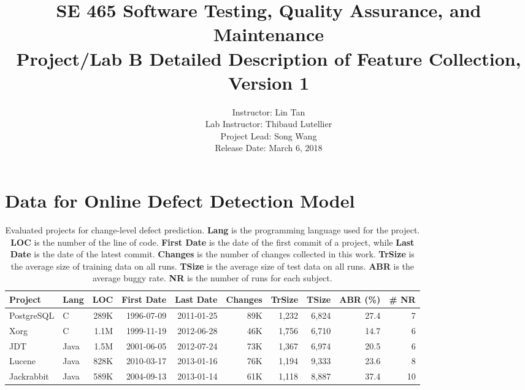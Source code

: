 \documentclass[10pt]{article}
\newcommand{\postgresqlloc}{289K}
\newcommand{\postgresqlfirstdate}{1996-07-09}
\newcommand{\postgresqllastdate}{2011-01-25}
\newcommand{\postgresqlchanges}{89K}
\newcommand{\postgresqlexpbr}{27.4}
\newcommand{\postgresqlTrain}{1,232}
\newcommand{\postgresqlTest}{6,824}
\newcommand{\xorgloc}{1.1M}
\newcommand{\xorgfirstdate}{1999-11-19}
\newcommand{\xorglastdate}{2012-06-28}
\newcommand{\xorgchanges}{46K}
\newcommand{\xorgexpbr}{14.7}
\newcommand{\xorgTrain}{1,756}
\newcommand{\xorgTest}{6,710}
\newcommand{\eclipseloc}{1.5M}
\newcommand{\eclipsefirstdate}{2001-06-05}
\newcommand{\eclipselastdate}{2012-07-24}
\newcommand{\eclipsechanges}{73K}
\newcommand{\eclipseexpbr}{20.5}
\newcommand{\eclipseTrain}{1,367}
\newcommand{\eclipseTest}{6,974}
\newcommand{\luceneloc}{828K}
\newcommand{\lucenefirstdate}{2010-03-17}
\newcommand{\lucenelastdate}{2013-01-16}
\newcommand{\lucenechanges}{76K}
\newcommand{\luceneexpbr}{23.6}
\newcommand{\luceneTrain}{1,194}
\newcommand{\luceneTest}{9,333}
\newcommand{\jackrabbitloc}{589K}
\newcommand{\jackrabbitfirstdate}{2004-09-13}
\newcommand{\jackrabbitlastdate}{2013-01-14}
\newcommand{\jackrabbitchanges}{61K}
\newcommand{\jackrabbitexpbr}{37.4}
\newcommand{\jackrabbitTrain}{1,118}
\newcommand{\jackrabbitTest}{8,887}
\begin{document}
\title{
SE 465 Software Testing, Quality Assurance, and Maintenance\\
Project/Lab B Detailed Description of Feature Collection, Version 1}
\author{Instructor: Lin Tan \\
Lab Instructor: Thibaud Lutellier \\
Project Lead: Song Wang\\
Release Date:  March 6, 2018 \\ 
}
\renewcommand{\today}{}
\maketitle


\section*{Data for Online Defect Detection Model} 

\begin{table*}[h!t]
\centering
\caption{Evaluated projects for change-level defect prediction. 
\textbf{Lang} is the programming language used for the project.
\textbf{LOC} is the number of the line of code.
\textbf{First Date} is the date of the first commit of a project, 
while \textbf{Last Date} is the date of the latest commit. 
\textbf{Changes} is the number of changes collected in this work. 
\textbf{TrSize} is the average size of training data on all runs. 
\textbf{TSize} is the average size of test data on all runs. 
\textbf{ABR} is the average buggy rate. 
\textbf{NR} is the number of runs for each subject.
}

\begin{tabular}{|l|l|r|r|r|r|r|r|r|r|}
\hline  Project & Lang & LOC & First Date & Last Date & Changes&TrSize&TSize& ABR (\%) & \# NR\\ \hline
PostgreSQL      & C     & \postgresqlloc & \postgresqlfirstdate & \postgresqllastdate & \postgresqlchanges &\postgresqlTrain&\postgresqlTest&\postgresqlexpbr & 7\\ \hline
Xorg            & C     & \xorgloc & \xorgfirstdate & \xorglastdate & \xorgchanges&\xorgTrain&\xorgTest &\xorgexpbr& 6 \\ \hline
JDT             & Java  & \eclipseloc & \eclipsefirstdate & \eclipselastdate & \eclipsechanges&\eclipseTrain&\eclipseTest &\eclipseexpbr & 6\\ \hline
Lucene          & Java  & \luceneloc & \lucenefirstdate & \lucenelastdate & \lucenechanges&\luceneTrain&\luceneTest &\luceneexpbr & 8\\ \hline
Jackrabbit      & Java  & \jackrabbitloc & \jackrabbitfirstdate & \jackrabbitlastdate & \jackrabbitchanges&\jackrabbitTrain&\jackrabbitTest &\jackrabbitexpbr & 10\\ \hline
\end{tabular}
\label{tab:changeProject}
\end{table*}
\end{document}
